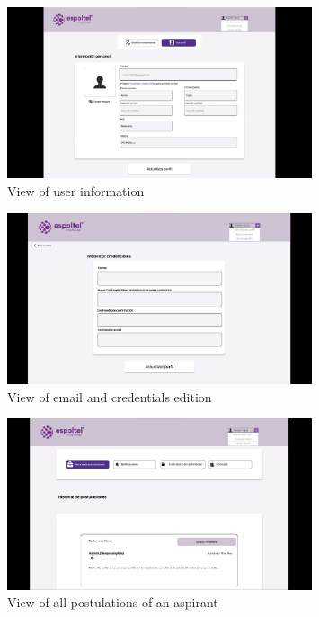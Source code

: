 \documentclass{scrreprt}
\begin{document}
\begin{figure}[H]
	\centering \small
	\includegraphics[width=0.8\textwidth]{WebPrototype/wflow-50.jpeg}
	\caption{View of user information}
\end{figure}

\begin{figure}[H]
	\centering \small
	\includegraphics[width=0.8\textwidth]{WebPrototype/wflow-51.jpeg}
	\caption{View of email and credentials edition}
\end{figure}

\begin{figure}[H]
	\centering \small
	\includegraphics[width=0.8\textwidth]{WebPrototype/wflow-52.jpeg}
	\caption{View of all postulations of an aspirant}
\end{figure}
\end{document}
